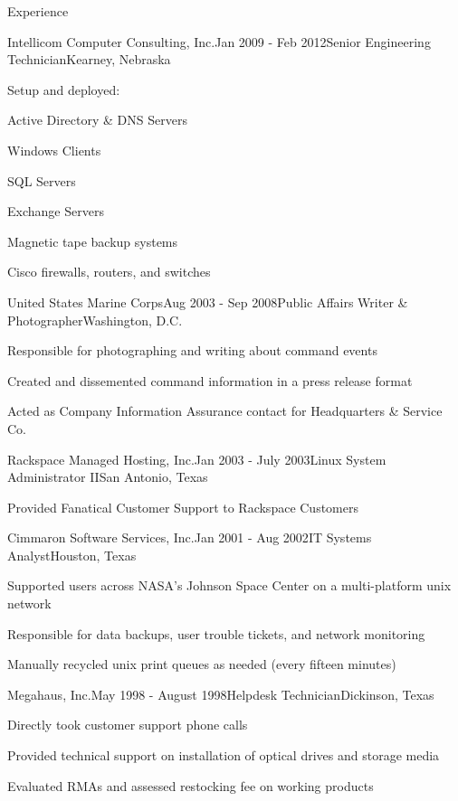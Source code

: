 \documentclass{resume} %
\begin{document}
\begin{rSection}{Experience}
\begin{rSubsection}{Intellicom Computer Consulting, Inc.}{Jan 2009 - Feb 2012}{Senior Engineering Technician}{Kearney, Nebraska}
\item Setup and deployed:
\item Active Directory \& DNS Servers
\item Windows Clients
\item SQL Servers
\item Exchange Servers
\item Magnetic tape backup systems
\item Cisco firewalls, routers, and switches
\end{rSubsection}

\begin{rSubsection}{United States Marine Corps}{Aug 2003 - Sep 2008}{Public Affairs Writer \& Photographer}{Washington, D.C.}
\item Responsible for photographing and writing about command events
\item Created and dissemented command information in a press release format
\item Acted as Company Information Assurance contact for Headquarters \& Service Co.
\end{rSubsection}

\begin{rSubsection}{Rackspace Managed Hosting, Inc.}{Jan 2003 - July 2003}{Linux System Administrator II}{San Antonio, Texas}
\item Provided Fanatical Customer Support to Rackspace Customers
\end{rSubsection}

\begin{rSubsection}{Cimmaron Software Services, Inc.}{Jan 2001 - Aug 2002}{IT Systems Analyst}{Houston, Texas}
\item Supported users across NASA's Johnson Space Center on a multi-platform unix network
\item Responsible for data backups, user trouble tickets, and network monitoring
\item Manually recycled unix print queues as needed (every fifteen minutes)
\end{rSubsection}

\begin{rSubsection}{Megahaus, Inc.}{May 1998 - August 1998}{Helpdesk Technician}{Dickinson, Texas}
\item Directly took customer support phone calls
\item Provided technical support on installation of optical drives and storage media 
\item Evaluated RMAs and assessed restocking fee on working products
\end{rSubsection}

\end{rSection}
\end{document}
